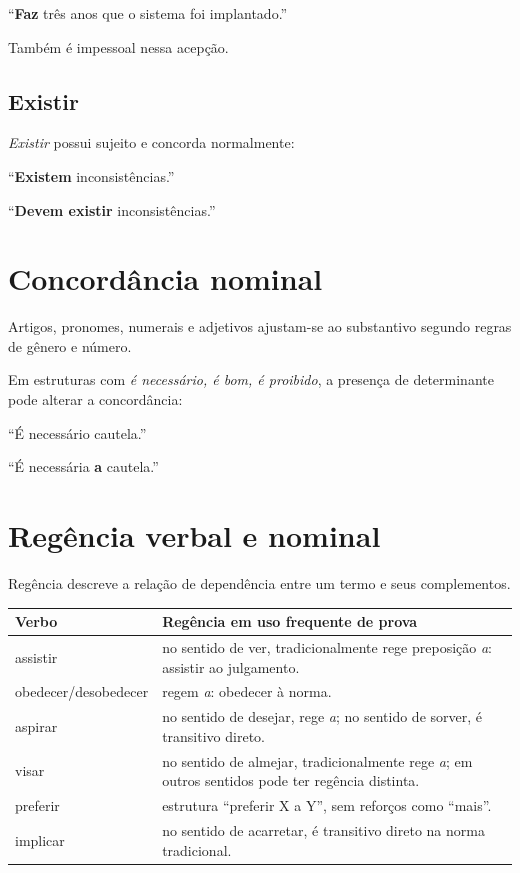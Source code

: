 ``\textbf{Faz} três anos que o sistema foi implantado.''

Também é impessoal nessa acepção.

\subsection{Existir}

\emph{Existir} possui sujeito e concorda normalmente:

``\textbf{Existem} inconsistências.''

``\textbf{Devem existir} inconsistências.''

\section{Concordância nominal}

Artigos, pronomes, numerais e adjetivos ajustam-se ao substantivo segundo regras de gênero e número.

Em estruturas com \emph{é necessário, é bom, é proibido}, a presença de determinante pode alterar a concordância:

``É necessário cautela.''

``É necessária \textbf{a} cautela.''

\section{Regência verbal e nominal}

Regência descreve a relação de dependência entre um termo e seus complementos.

\begin{table}[ht]
\centering
\small
\begin{tabularx}{\textwidth}{l X}
\toprule
Verbo & Regência em uso frequente de prova \\
\midrule
assistir & no sentido de ver, tradicionalmente rege preposição \emph{a}: assistir ao julgamento. \\
obedecer/desobedecer & regem \emph{a}: obedecer à norma. \\
aspirar & no sentido de desejar, rege \emph{a}; no sentido de sorver, é transitivo direto. \\
visar & no sentido de almejar, tradicionalmente rege \emph{a}; em outros sentidos pode ter regência distinta. \\
preferir & estrutura ``preferir X a Y'', sem reforços como ``mais''. \\
implicar & no sentido de acarretar, é transitivo direto na norma tradicional. \\
\bottomrule
\end{tabularx}
\end{table}

